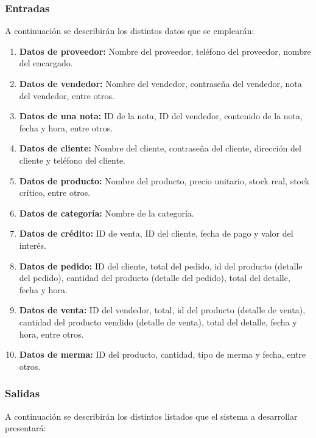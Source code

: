 \documentclass[letterpaper,12pt]{article}
\renewcommand{\labelenumi}{\alph{enumi})}
\begin{document}
\newpage


\renewcommand{\labelenumi}{\arabic{enumi})}

\subsubsection{Entradas}

A continuación se describirán los distintos datos que se emplearán:

\begin{enumerate}
\item \textbf{Datos de proveedor:}
Nombre del proveedor, teléfono del proveedor, nombre del encargado.
\item \textbf{Datos de vendedor:}
Nombre del vendedor, contraseña del vendedor, nota del vendedor, entre otros.
\item \textbf{Datos de una nota:}
ID de la nota, ID del vendedor, contenido de la nota, fecha y hora, entre otros. 
\item \textbf{Datos de cliente:}
Nombre del cliente, contraseña del cliente, dirección del cliente y teléfono del cliente.
\item \textbf{Datos de producto:}
Nombre del producto, precio unitario, stock real, stock crítico, entre otros.
\item \textbf{Datos de categoría:}
Nombre de la categoría.
\item \textbf{Datos de crédito:} 
ID de venta, ID del cliente, fecha de pago y valor del interés.
\item \textbf{Datos de pedido:}
ID del cliente, total del pedido, id del producto (detalle del pedido), cantidad del producto (detalle del pedido), total del detalle, fecha y hora.
\item \textbf{Datos de venta:} 
ID del vendedor, total, id del producto (detalle de venta), cantidad del producto vendido (detalle de venta), total del detalle, fecha y hora, entre otros.
\item \textbf{Datos de merma:} 
ID del producto, cantidad, tipo de merma y fecha, entre otros.
\end{enumerate}

\newpage

\subsubsection{Salidas}

A continuación se describirán los distintos listados que el sistema a desarrollar presentará:
\end{document}
